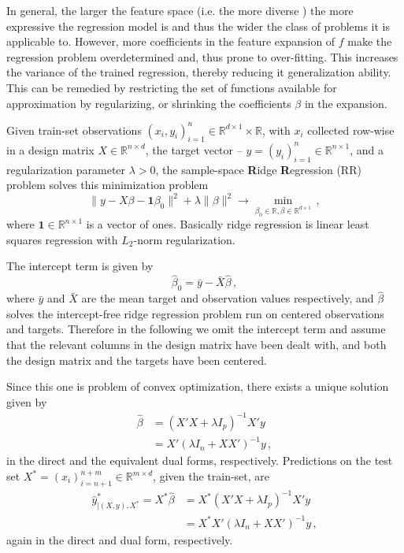 \documentclass[a4paper,14pt]{extarticle}
\newcommand{\Real}{\mathbb{R}}
\newcommand{\one}{\mathbf{1}}
\begin{document}
In general, the larger the feature space (i.e. the more diverse ) the more expressive
the regression model is and thus the wider the class of problems it is applicable
to. However, more coefficients in the feature expansion of $f$ make the regression
problem overdetermined and, thus prone to over-fitting. This increases the variance
of the trained regression, thereby reducing it generalization ability. This can be
remedied by restricting the set of functions available for approximation by regularizing,
or shrinking the coefficients $\beta$ in the expansion.

Given train-set observations $(x_i, y_i)_{i=1}^n \in \Real^{d\times 1}\times \Real$,
with $x_i$ collected row-wise in a design matrix $X\in \Real^{n\times d}$, the target
vector -- $y=(y_i)_{i=1}^n \in \Real^{n\times 1}$, and a regularization parameter
$\lambda > 0$, the sample-space \textbf{R}idge \textbf{R}egression (RR) problem solves
this minimization problem
\begin{equation}
  \| y - X\beta - \one\beta_0 \|^2 + \lambda \|\beta\|^2
    \to \min_{\beta_0\in \Real, \beta \in \Real^{d\times 1}} \,,
\end{equation}
where $\one \in \Real^{n\times 1}$ is a vector of ones. Basically ridge regression
is linear least squares regression with $L_2$-norm regularization.

The intercept term is given by
\begin{equation}
  \hat{\beta}_0 = \bar{y} - \bar{X} \hat{\beta} \,,
\end{equation}
where $\bar{y}$ and $\bar{X}$ are the mean target and observation values respectively,
and $\hat{\beta}$ solves the intercept-free ridge regression problem run on centered
observations and targets. Therefore in the following we omit the intercept term and
assume that the relevant columns in the design matrix have been dealt with, and both
the design matrix and the targets have been centered.

Since this one is problem of convex optimization, there exists a unique solution
given by 
\begin{align*}
  \hat{\beta}
    &= (X'X + \lambda I_p)^{-1} X' y \\
    &= X' (\lambda I_n + XX')^{-1} y \,,
\end{align*}
in the direct and the equivalent dual forms, respectively. Predictions on the test
set $X^* = (x_i)_{i=n+1}^{n+m}\in \Real^{m\times d}$, given the train-set, are
\begin{align}
  \hat{y}^*_{\vert(X,y), X^*} = X^* \hat{\beta}
    &= X^* (X'X + \lambda I_p)^{-1} X' y \nonumber \\ 
    &= X^* X' (\lambda I_n + XX')^{-1} y \label{eq:rr_dual_sol}\,,
\end{align}
again in the direct and dual form, respectively.
\end{document}
